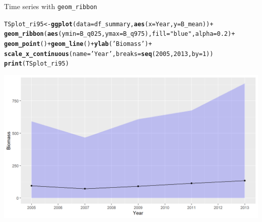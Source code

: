 \documentclass{beamer}\usepackage[]{graphicx}\usepackage[]{color}
\makeatletter
\newcommand{\hlnum}[1]{\textcolor[rgb]{0.686,0.059,0.569}{#1}}%
\newcommand{\hlstr}[1]{\textcolor[rgb]{0.192,0.494,0.8}{#1}}%
\newcommand{\hlopt}[1]{\textcolor[rgb]{0,0,0}{#1}}%
\newcommand{\hlstd}[1]{\textcolor[rgb]{0.345,0.345,0.345}{#1}}%
\newcommand{\hlkwb}[1]{\textcolor[rgb]{0.69,0.353,0.396}{#1}}%
\newcommand{\hlkwc}[1]{\textcolor[rgb]{0.333,0.667,0.333}{#1}}%
\newcommand{\hlkwd}[1]{\textcolor[rgb]{0.737,0.353,0.396}{\textbf{#1}}}%
\newenvironment{kframe}{%
 \def\at@end@of@kframe{}%
 \ifinner\ifhmode%
  \def\at@end@of@kframe{\end{minipage}}%
  \begin{minipage}{\columnwidth}%
 \fi\fi%
 \def\FrameCommand##1{\hskip\@totalleftmargin \hskip-\fboxsep
 \colorbox{shadecolor}{##1}\hskip-\fboxsep
     \hskip-\linewidth \hskip-\@totalleftmargin \hskip\columnwidth}%
 \MakeFramed {\advance\hsize-\width
   \@totalleftmargin\z@ \linewidth\hsize
   \@setminipage}}%
 {\par\unskip\endMakeFramed%
 \at@end@of@kframe}
\newenvironment{knitrout}{}{} %
\makeatother
\begin{document}
\begin{frame}[fragile]{Time series with \lstinline{geom_ribbon}}
\begin{knitrout}\footnotesize
{}\color{fgcolor}\begin{kframe}
\begin{alltt}
\hlstd{TSplot_ri95} \hlkwb{<-} \hlkwd{ggplot}\hlstd{(}\hlkwc{data}\hlstd{=df_summary,} \hlkwd{aes}\hlstd{(}\hlkwc{x}\hlstd{=Year,} \hlkwc{y}\hlstd{=B_mean))} \hlopt{+}
  \hlkwd{geom_ribbon}\hlstd{(}\hlkwd{aes}\hlstd{(}\hlkwc{ymin} \hlstd{= B_q025,} \hlkwc{ymax} \hlstd{= B_q975),} \hlkwc{fill} \hlstd{=} \hlstr{"blue"}\hlstd{,} \hlkwc{alpha}\hlstd{=}\hlnum{0.2}\hlstd{)} \hlopt{+}
  \hlkwd{geom_point}\hlstd{()} \hlopt{+} \hlkwd{geom_line}\hlstd{()} \hlopt{+} \hlkwd{ylab}\hlstd{(}\hlstr{'Biomass'}\hlstd{)} \hlopt{+}
  \hlkwd{scale_x_continuous}\hlstd{(}\hlkwc{name} \hlstd{=} \hlstr{'Year'}\hlstd{,} \hlkwc{breaks} \hlstd{=} \hlkwd{seq}\hlstd{(}\hlnum{2005}\hlstd{,} \hlnum{2013}\hlstd{,} \hlkwc{by} \hlstd{=} \hlnum{1}\hlstd{))}
\hlkwd{print}\hlstd{(TSplot_ri95)}
\end{alltt}
\end{kframe}

{\centering \includegraphics[width=.9\linewidth]{figure/sp_TSplot_ri95-1} 

}



\end{knitrout}
\end{frame}

\end{document}
